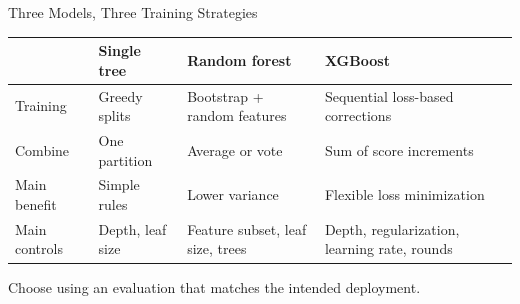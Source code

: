 \begin{frame}{Three Models, Three Training Strategies}
  \centering
  \small\renewcommand{\arraystretch}{1.15}
  \begin{tabular}{>{\raggedright\arraybackslash}p{2.1cm}>{\raggedright\arraybackslash}p{3.0cm}>{\raggedright\arraybackslash}p{3.3cm}>{\raggedright\arraybackslash}p{3.5cm}}
    \toprule
     & \textbf{Single tree} & \textbf{Random forest} & \textbf{XGBoost}\\ \midrule
    Training & Greedy splits & Bootstrap + random features & Sequential loss-based corrections\\
    Combine & One partition & Average or vote & Sum of score increments\\
    Main benefit & Simple rules & Lower variance & Flexible loss minimization\\
    Main controls & Depth, leaf size & Feature subset, leaf size, trees & Depth, regularization, learning rate, rounds\\ \bottomrule
  \end{tabular}
  \vspace{.4cm}
  \par Choose using an evaluation that matches the intended deployment.
\end{frame}

